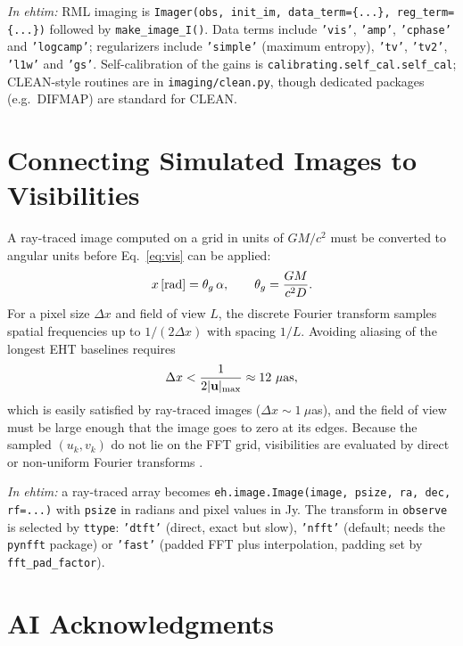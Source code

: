 \documentclass[11pt]{article}
\newcommand{\ehtimnote}[1]{%
  \par\smallskip\noindent
  \colorbox{gray!12}{\parbox{\dimexpr\linewidth-2\fboxsep}{\small\textit{In ehtim:} #1}}%
  \par\smallskip}
\begin{document}
\ehtimnote{RML imaging is \texttt{Imager(obs, init\_im, data\_term=\{...\},
reg\_term=\{...\})} followed by \texttt{make\_image\_I()}. Data terms include
\texttt{'vis'}, \texttt{'amp'}, \texttt{'cphase'} and \texttt{'logcamp'};
regularizers include \texttt{'simple'} (maximum entropy), \texttt{'tv'},
\texttt{'tv2'}, \texttt{'l1w'} and \texttt{'gs'}. Self-calibration of the
gains is \texttt{calibrating.self\_cal.self\_cal}; CLEAN-style routines are in
\texttt{imaging/clean.py}, though dedicated packages (e.g.\ DIFMAP) are
standard for CLEAN.}

\section{Connecting Simulated Images to Visibilities}

A ray-traced image computed on a grid in units of $GM/c^2$ must be converted
to angular units before Eq.~\eqref{eq:vis} can be applied:
\begin{equation}
x\,[{\rm rad}] = \theta_g\,\alpha, \qquad
\theta_g = \frac{GM}{c^2 D}.
\end{equation}
For a pixel size $\Delta x$ and field of view $L$, the discrete Fourier
transform samples spatial frequencies up to $1/(2\Delta x)$ with spacing
$1/L$. Avoiding aliasing of the longest EHT baselines requires
\begin{equation}
\Delta x < \frac{1}{2|\mathbf{u}|_{\max}} \approx 12~\mu{\rm as},
\end{equation}
which is easily satisfied by ray-traced images ($\Delta x \sim 1~\mu$as), and
the field of view must be large enough that the image goes to zero at its
edges. Because the sampled $(u_k, v_k)$ do not lie on the FFT grid,
visibilities are evaluated by direct or non-uniform Fourier transforms
\cite{Chael2018}.

\ehtimnote{a ray-traced array becomes
\texttt{eh.image.Image(image, psize, ra, dec, rf=...)} with \texttt{psize}
in radians and pixel values in Jy. The transform in \texttt{observe} is
selected by \texttt{ttype}: \texttt{'dtft'} (direct, exact but slow),
\texttt{'nfft'} (default; needs the \texttt{pynfft} package) or
\texttt{'fast'} (padded FFT plus interpolation, padding set by
\texttt{fft\_pad\_factor}).}

\section*{AI Acknowledgments}
\label{sec:ai}
\end{document}

